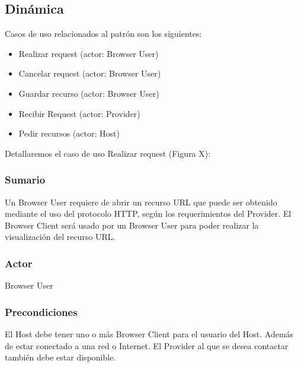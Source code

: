 \subsection{Dinámica}
Casos de uso relacionados al patrón son los siguientes:
\begin{itemize}
	\item Realizar request (actor: Browser User)
	\item Cancelar request (actor: Browser User)
	\item Guardar recurso (actor: Browser User)
	\item Recibir Request (actor: Provider)
	\item Pedir recursos (actor: Host)
\end{itemize}
Detallaremos el caso de uso Realizar request (Figura X):
\subsubsection{Sumario} Un Browser User requiere de abrir un recurso URL que puede ser obtenido mediante el uso del protocolo HTTP, según los requerimientos del Provider. El Browser Client será usado por un Browser User para poder realizar la visualización del recurso URL.
\subsubsection{Actor} Browser User
\subsubsection{Precondiciones} El Host debe tener uno o más Browser Client para el usuario del Host. Además de estar conectado a una red o Internet. El Provider al que se desea contactar también debe estar disponible.
